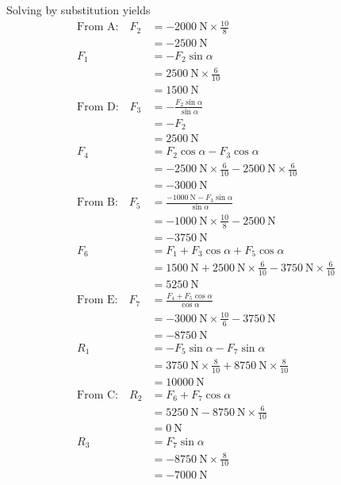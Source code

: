 \documentclass[a4paper,justified,oneside]{tufte-handout}
\numberwithin{equation}{subsection}
\begin{document}
\begin{solution}
Solving by substitution yields
\begin{align*}
	\text{From A:}\quad	F_2	&=	\SI{-2000}{\N} \times \frac{10}{8}	\\
							&=	\SI{-2500}{\N}	\\
						F_1	&=	-F_2 \sin\alpha	\\
							&=	\SI{2500}{\N} \times 	\frac{6}{10}	\\
							&=	\SI{1500}{\N}	\\
	\text{From D:}\quad	F_3	&=	-\frac{F_2\sin\alpha}{\sin\alpha}	\\
							&=	-F_2	\\
							&=	\SI{2500}{\N}	\\
						F_4	&=	F_2\cos\alpha	-F_3\cos\alpha	\\
							&=	\SI{-2500}{\N} \times\frac{6}{10}	-\SI{2500}{\N}	\times\frac{6}{10}	\\
							&=	\SI{-3000}{\N}	\\
	\text{From B:}\quad	F_5	&=	\frac{-\SI{1000}{\N} -F_3\sin\alpha}{\sin\alpha}	\\
							&=	\SI{-1000}{\N}\times\frac{10}{8}	-\SI{2500}{\N}	\\
							&=	\SI{-3750}{\N}	\\
						F_6	&=	F_1	+F_3\cos\alpha	+F_5\cos\alpha	\\
							&=	\SI{1500}{\N}	+\SI{2500}{\N}\times\frac{6}{10}	-\SI{3750}{\N}\times\frac{6}{10}	\\
							&=	\SI{5250}{\N}	\\
	\text{From E:}\quad	F_7	&=	\frac{F_4 +F_5\cos\alpha}{\cos\alpha}	\\
							&=	\SI{-3000}{\N}	\times\frac{10}{6}	-\SI{3750}{\N}	\\
							&=	\SI{-8750}{\N}	\\
						R_1	&=	-F_5\sin\alpha	-F_7\sin\alpha	\\
							&=	\SI{3750}{\N}	\times \frac{8}{10}	+\SI{8750}{\N}	\times\frac{8}{10}	\\
							&=	\SI{10000}{\N}	\\
	\text{From C:}\quad	R_2	&=	F_6	+F_7\cos\alpha	\\
							&=	\SI{5250}{\N}	-\SI{8750}{\N}	\times\frac{6}{10}	\\
							&=	\SI{0}{\N}	\\
						R_3	&=	F_7\sin\alpha	\\
							&=	\SI{-8750}{\N}	\times\frac{8}{10}	\\
							&=	\SI{-7000}{\N}
\end{align*}


\end{solution}
\end{document}
